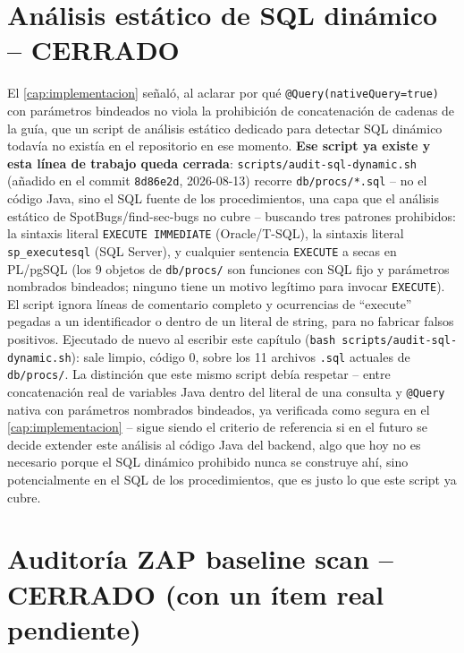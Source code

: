 \section{Análisis estático de SQL dinámico -- CERRADO}

El \autoref{cap:implementacion} señaló, al aclarar por qué
\texttt{@Query(nativeQuery=true)} con parámetros bindeados no viola la
prohibición de concatenación de cadenas de la guía, que un script de
análisis estático dedicado para detectar SQL dinámico todavía no existía
en el repositorio en ese momento. \textbf{Ese script ya existe y esta
línea de trabajo queda cerrada}: \texttt{scripts/audit-sql-dynamic.sh}
(añadido en el commit \texttt{8d86e2d}, 2026-08-13) recorre
\texttt{db/procs/*.sql} -- no el código Java, sino el SQL fuente de los
procedimientos, una capa que el análisis estático de SpotBugs/find-sec-bugs
no cubre -- buscando tres patrones prohibidos: la sintaxis literal
\texttt{EXECUTE IMMEDIATE} (Oracle/T-SQL), la sintaxis literal
\texttt{sp\_executesql} (SQL Server), y cualquier sentencia \texttt{EXECUTE}
a secas en PL/pgSQL (los 9 objetos de \texttt{db/procs/} son funciones con
SQL fijo y parámetros nombrados bindeados; ninguno tiene un motivo
legítimo para invocar \texttt{EXECUTE}). El script ignora líneas de
comentario completo y ocurrencias de ``execute'' pegadas a un
identificador o dentro de un literal de string, para no fabricar falsos
positivos. Ejecutado de nuevo al escribir este capítulo
(\texttt{bash scripts/audit-sql-dynamic.sh}): sale limpio, código 0,
sobre los 11 archivos \texttt{.sql} actuales de \texttt{db/procs/}. La
distinción que este mismo script debía respetar -- entre concatenación
real de variables Java dentro del literal de una consulta y
\texttt{@Query} nativa con parámetros nombrados bindeados, ya verificada
como segura en el \autoref{cap:implementacion} -- sigue siendo el
criterio de referencia si en el futuro se decide extender este análisis
al código Java del backend, algo que hoy no es necesario porque el SQL
dinámico prohibido nunca se construye ahí, sino potencialmente en el SQL
de los procedimientos, que es justo lo que este script ya cubre.

\section{Auditoría ZAP baseline scan -- CERRADO (con un ítem real pendiente)}
\label{sec:tf-zap}

